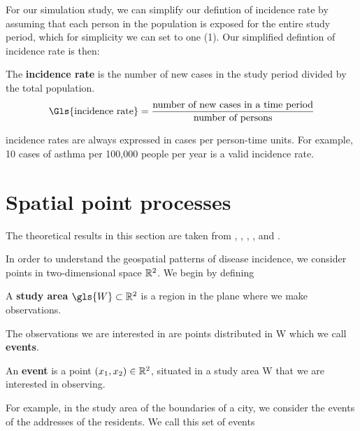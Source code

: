 For our simulation study, we can simplify our defintion of \gls{incidence rate} by assuming that each person in the population is exposed for the entire study period,
which for simplicity we can set to one (1).
Our simplified defintion of incidence rate is then:

\begin{defn}
    The \textbf{\gls{incidence rate}} is the number of new cases in the study period divided by the total population.
    \begin{equation}
        \mbox{\Gls{incidence rate}} = \frac{\mbox{number of new cases in a time period}}
                                        {\mbox{number of persons}}
    \end{equation}
\end{defn}

\Glspl{incidence rate} are always expressed in cases per person-time units.
For example, 10 cases of asthma per 100,000 people per year is a valid \gls{incidence rate}.

%
%
\section{Spatial point processes}
\label{sec:theory:spatial_point_processes}

The theoretical results in this section are taken from \citet{diggle1983spatial},
\citet{diggle1988equivalence},
\citet{guan2008consistent},
\citet{silverman1986density},
and \citet{wand1994kernel}.

In order to understand the geospatial patterns of disease incidence,
we consider points in two-dimensional space $\mathbb{R}^2$.
We begin by defining

\begin{defn}
    A \textbf{study area} $\gls{W} \subset \RS$ is a region in the plane where we make observations.
\end{defn}

The observations we are interested in are points distributed in \gls{W} which we call \textbf{events}.

\begin{defn}
    An \textbf{event} is a point $(x_1, x_2) \in \mathbb{R}^2$, situated in a study area \gls{W} that we are interested in observing.
\end{defn}

For example, in the study area of the boundaries of a city, we consider the events of the addresses of the residents.
We call this set of events

